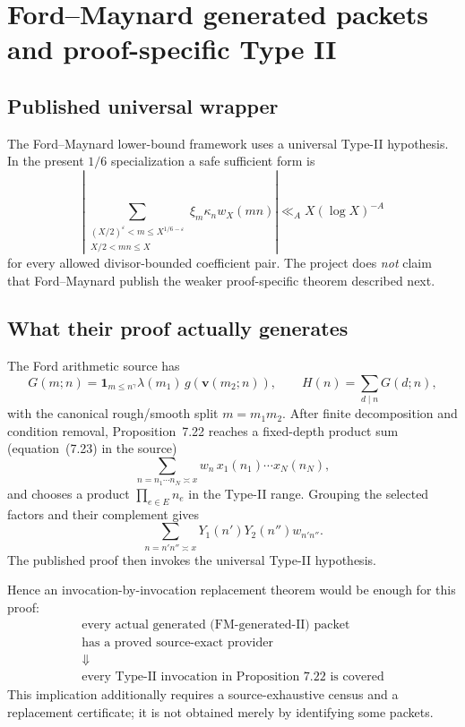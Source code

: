 \documentclass[11pt]{article}
\theoremstyle{definition}
\newcommand{\1}{\mathbf 1}
\begin{document}
\section{Ford--Maynard generated packets and proof-specific Type II}
\label{sec:ford-theory}

\subsection{Published universal wrapper}

The Ford--Maynard lower-bound framework uses a universal Type-II hypothesis.  In the
present $1/6$ specialization a safe sufficient form is
\[
\boxed{
\left|
\sum_{\substack{(X/2)^{\varepsilon}<m\le X^{1/6-\varepsilon}\\X/2<mn\le X}}
\xi_m\kappa_n w_X(mn)
\right|
\ll_A X(\log X)^{-A}
}
\tag{FM-universal-II}
\]
for every allowed divisor-bounded coefficient pair.  The project does \emph{not} claim
that Ford--Maynard publish the weaker proof-specific theorem described next.

\subsection{What their proof actually generates}

The Ford arithmetic source has
\[
G(m;n)
=
\mathbf 1_{m\le n^\gamma}\lambda(m_1)\,
g(\mathbf v(m_2;n)),
\qquad
\boxed{H(n)=\sum_{d\mid n}G(d;n),}
\tag{FM-GH}
\]
with the canonical rough/smooth split $m=m_1m_2$.
After finite decomposition and condition removal, Proposition~7.22 reaches a fixed-depth
product sum (equation~(7.23) in the source)
\[
\sum_{n=n_1\cdots n_N\asymp x}
w_n\,x_1(n_1)\cdots x_N(n_N),
\tag{FM-7.23}
\]
and chooses a product $\prod_{e\in E}n_e$ in the Type-II range.
Grouping the selected factors and their complement gives
\[
\boxed{
\sum_{n=n'n''\asymp x}
Y_1(n')Y_2(n'')w_{n'n''}.
}
\tag{FM-generated-II}
\]
The published proof then invokes the universal Type-II hypothesis.

Hence an invocation-by-invocation replacement theorem would be enough for this proof:
\[
\boxed{
\begin{gathered}
\text{every actual generated (FM-generated-II) packet}\\
\text{has a proved source-exact provider}\\
\Downarrow\\
\text{every Type-II invocation in Proposition 7.22 is covered}
\end{gathered}}
\tag{FM-replacement-logic}
\]
This implication additionally requires a source-exhaustive census and a replacement
certificate; it is not obtained merely by identifying some packets.
\end{document}
